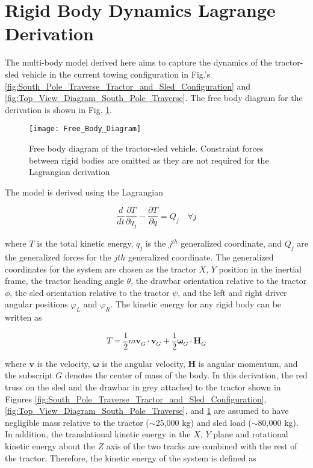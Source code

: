 \section{Rigid Body Dynamics Lagrange Derivation}
\label{subsec2}
The multi-body model derived here aims to capture the dynamics of the tractor-sled vehicle in the current towing configuration in Fig.'s  \ref{fig:South_Pole_Traverse_Tractor_and_Sled_Configuration} and \ref{fig:Top_View_Diagram_South_Pole_Traverse}. The free body diagram for the derivation is shown in Fig. \ref{fig:Free_Body_Diagram}.
\begin{figure}[h]
    \centering
    \texttt{[image: Free\_Body\_Diagram]}
    \caption{Free body diagram of the tractor-sled vehicle. Constraint forces between rigid bodies are omitted as they are not required for the Lagrangian derivation}
    \label{fig:Free_Body_Diagram}
\end{figure}
The model is derived using the Lagrangian
\begin{linenomath*}
    \begin{equation} \label{eq:lagrange}
        \frac{d}{dt}\frac{\partial T}{\partial \dot q_j} - \frac{\partial T}{\partial \dot q} = Q_j \quad \forall j
    \end{equation}
\end{linenomath*}
where $T$ is the total kinetic energy, $q_j$ is the $j^{th}$ generalized coordinate, and $Q_j$ are the generalized forces for the $j{th}$ generalized coordinate. The generalized coordinates for the system are chosen as the tractor $X$, $Y$ position in the inertial frame, the tractor heading angle $\theta$, the drawbar orientation relative to the tractor $\phi$, the sled orientation relative to the tractor $\psi$, and the left and right driver angular positions $\varphi_L$ and $\varphi_R$. The kinetic energy for any rigid body can be written as
\begin{linenomath*}
    \begin{equation}
        T = \frac{1}{2}m\mathbf{v}_G\cdot\textbf{v}_G + \frac{1}{2}\boldsymbol{\omega}_G\cdot\mathbf{H}_G
    \end{equation}
\end{linenomath*}
where $\mathbf{v}$ is the velocity, $\boldsymbol{\omega}$ is the angular velocity, $\mathbf{H}$ is angular momentum, and the subscript $G$ denotes the center of mass of the body. In this derivation, the red truss on the sled and the drawbar in grey attached to the tractor shown in Figures \ref{fig:South_Pole_Traverse_Tractor_and_Sled_Configuration}, \ref{fig:Top_View_Diagram_South_Pole_Traverse}, and \ref{fig:Free_Body_Diagram} are assumed to have negligible mass relative to the tractor ($\sim$25,000 kg) and sled load ($\sim$80,000 kg). In addition, the translational kinetic energy in the $X$, $Y$ plane and rotational kinetic energy about the $Z$ axis of the two tracks are combined with the rest of the tractor. Therefore, the kinetic energy of the system is defined as
